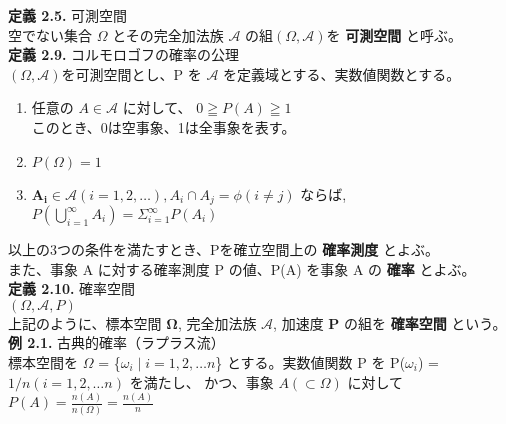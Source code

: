 \documentclass[dvipdfmx,10pt, a4j]{jarticle}
\theoremstyle{definition}
\begin{document}
    \noindent
    \textbf{定義 2.5.} 可測空間\\
    空でない集合 $\Omega$ とその完全加法族 $\mathcal{A}$ の組$(\Omega, \mathcal{A})$を \textbf{可測空間} と呼ぶ。\\

    \noindent
    \textbf{定義 2.9.} コルモロゴフの確率の公理\\
    $(\Omega, \mathcal{A})$を可測空間とし、P を $\mathcal{A}$ を定義域とする、実数値関数とする。
    \begin{enumerate}
        \renewcommand{\labelenumi}{\roman{enumi})}
        \item 任意の $A \in \mathcal{A}$ に対して、 $0 \geqq P(A) \geqq 1$\\
        このとき、0は空事象、1は全事象を表す。\\
        \item $P(\Omega) = 1$
        \item $\bm{A_i} \in \mathcal{A}(i = 1, 2, \dots), {A_i} \cap {A_j} = \phi (i \neq j)$ ならば, \\
        $P\left(\displaystyle\bigcup_{i=1}^{\infty}{A_i}\right) = \Sigma_{i=1}^{\infty}P(A_i)$
    \end{enumerate}
    以上の3つの条件を満たすとき、Pを確立空間上の \textbf{確率測度} とよぶ。\\
    また、事象 A に対する確率測度 P の値、P(A) を事象 A の \textbf{確率} とよぶ。\\

    \noindent
    \textbf{定義 2.10.} 確率空間\\
    $(\Omega, \mathcal{A}, P)$\\
    上記のように、標本空間 $\bm{\Omega}$, 完全加法族 $\bm{\mathcal{A}}$, 加速度 $\bm{P}$ の組を \textbf{確率空間} という。\\

    \noindent
    \textbf{例 2.1.} 古典的確率（ラプラス流）\\
    標本空間を $\Omega$ = \{${\omega_i} \mid i = 1,2,\dots n$\} とする。実数値関数 P を P({$\omega_i$}) = $1/n(i = 1,2,\dots n)$ を満たし、
    かつ、事象 $A(\subset \Omega)$ に対して\\

    $P(A) = \frac{n(A)}{n(\Omega)} = \frac{n(A)}{n}$\\
\end{document}
